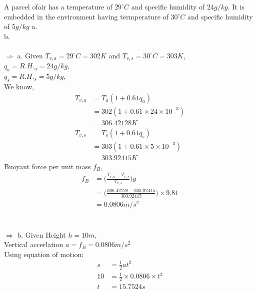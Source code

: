\documentclass[fleqn,10pt]{SelfArx} %
\begin{document}
\begin{question}[label=q:6.1]{A parcel ofair has a temperature of $29^\circ C$ and specific humidity of $24 g/kg$. It is embedded in the environment having termperature of $30^\circ C$ and specific humidity of $5g/kg$ \newline
        a.  \\
        b. \\  \\ 
    }
    $\Rightarrow$ a. Given $T_{v,a} =29^\circ C= 302K$ and $T_{v,s} =30^\circ C= 303K$,\\ 
                    $q_a=R.H._a = 24g/kg$, \\
                    $q_s=R.H._s = 5g/kg$,\\ 
        We know, 
        \begin{align*}
            T_{v,a} &= T_a(1+0.61q_a)\\
                    &= 302(1+0.61 \times 24 \times 10^{-3}) \\
                    &= 306.42128 K \\
            T_{v,s} &= T_s(1+0.61q_s)\\
                    &= 303(1+0.61 \times 5 \times 10^{-3}) \\
                    &= 303.92415 K
        \end{align*}
        Buoyant force per unit mass $f_B$,
        \begin{align*}
            f_B &= \Big(\frac{T_{v,a} - T_{v,s}}{T_{v,s}}\Big)g\\
                &= \Big(\frac{306.42128 - 303.92415}{303.92415}\Big)\times 9.81\\
                &= 0.0806 m/s^2
        \end{align*}
     \\  \\

    $\Rightarrow$ b. Given Height $h=10m$, \\
                           Vertical accerlation $a=f_B=0.0806 m/s^2$ \\

        Using equation of motion:
        \begin{align*}
            s &= \frac{1}{2} at^2 \\
            10 &= \frac{1}{2} \times 0.0806 \times t^2 \\
            t &= 15.7524 s
        \end{align*}
     \\  \\
\end{question}
\end{document}
